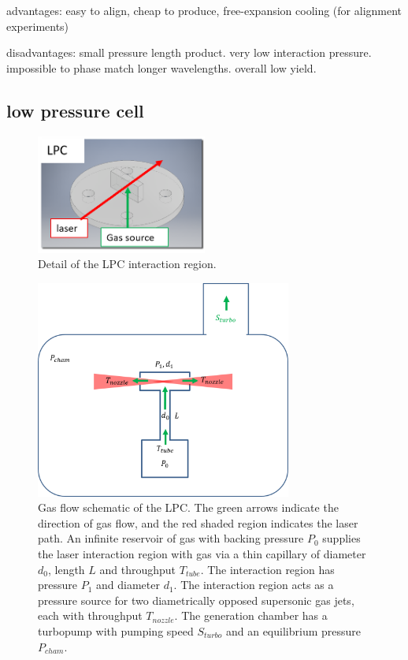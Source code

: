 advantages: easy to align, cheap to produce, free-expansion cooling (for alignment experiments)

disadvantages: small pressure length product. very low interaction pressure. impossible to phase match longer wavelengths. overall low yield. 

\subsection{low pressure cell}

\begin{figure}
	\centering
	\includegraphics[width=0.5\textwidth]{figures/chap2/LPC_diagram.png}
	\caption{Detail of the LPC interaction region.}
	\label{fig:LPC_diagram}
\end{figure}

\begin{figure}
	\centering
	\includegraphics[width=0.75\textwidth]{figures/chap2/LPC_schematic2.png}
	\caption{Gas flow schematic of the LPC. The green arrows indicate the direction of gas flow, and the red shaded region indicates the laser path. An infinite reservoir of gas with backing pressure $P_0$ supplies the laser interaction region with gas via a thin capillary of diameter $d_0$, length $L$ and throughput $T_{tube}$. The interaction region has pressure $P_1$ and diameter $d_1$. The interaction region acts as a pressure source for two diametrically opposed supersonic gas jets, each with throughput $T_{nozzle}$. The generation chamber has a turbopump with pumping speed $S_{turbo}$ and an equilibrium pressure $P_{cham}$.}
	\label{fig:LPC_schematic}
\end{figure}

